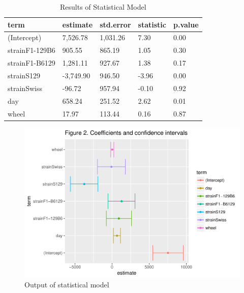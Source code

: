 \documentclass[english,man]{apa6}
\theoremstyle{definition}
\theoremstyle{definition}
\theoremstyle{definition}
\theoremstyle{remark}
\begin{document}
\begin{table}[tbp]
\begin{center}
\begin{threeparttable}
\caption{\label{tab:table2}Results of Statistical Model}
\begin{tabular}{lllll}
\toprule
term & \multicolumn{1}{c}{estimate} & \multicolumn{1}{c}{std.error} & \multicolumn{1}{c}{statistic} & \multicolumn{1}{c}{p.value}\\
\midrule
(Intercept) & 7,526.78 & 1,031.26 & 7.30 & 0.00\\
strainF1-129B6 & 905.55 & 865.19 & 1.05 & 0.30\\
strainF1-B6129 & 1,281.11 & 927.67 & 1.38 & 0.17\\
strainS129 & -3,749.90 & 946.50 & -3.96 & 0.00\\
strainSwiss & -96.72 & 957.94 & -0.10 & 0.92\\
day & 658.24 & 251.52 & 2.62 & 0.01\\
wheel & 17.97 & 113.44 & 0.16 & 0.87\\
\bottomrule
\end{tabular}
\end{threeparttable}
\end{center}
\end{table}

\begin{figure}

{\centering \includegraphics{james_paper_files/figure-latex/fig2-1} 

}

\caption{Output of statistical model}\label{fig:fig2}
\end{figure}
\end{document}
